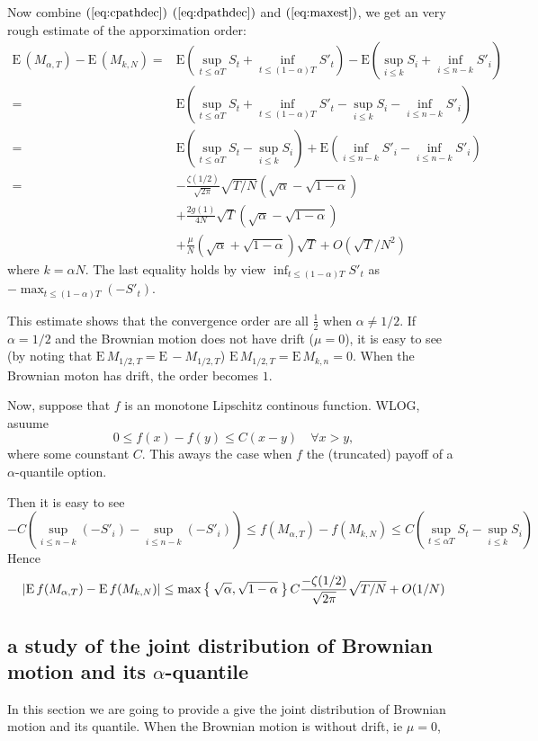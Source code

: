 \documentclass[11pt]{book}
\def\abs#1{{\left|#1\right|}}
\def\E{{\mathrm{E}\,}}
\def\EE#1{{{\mathrm{E}}\left(#1\right)}}
\begin{document}
Now combine $(\ref{eq:cpathdec})$ $(\ref{eq:dpathdec})$ and $(\ref{eq:maxest})$,
we get an very rough estimate of the apporximation order:
\begin{equation}
\begin{split}
\E (M_{\alpha,T}) - \E (M_{k,N})
=& \EE{\sup_{t\leq \alpha{T}} S_t +\inf_{t \leq (1-\alpha)T}S'_t} 
- \EE{\sup_{i\leq k} S_i+\inf_{i\leq n-k} S'_i}\\
=& \EE{\sup_{t\leq \alpha{T}} S_t +\inf_{t \leq (1-\alpha)T}S'_t
-  \sup_{i\leq k} S_i-\inf_{i\leq n-k} S'_i} \\
= &  \EE{\sup_{t\leq \alpha{T}} S_t - \sup_{i\leq k} S_i} +
\EE{\inf_{i\leq n-k} S'_i-\inf_{i\leq n-k} S'_i}\\
=& -\frac{\zeta(1/2)}{\sqrt{2\pi}}\sqrt{T/N} 
\left(\sqrt{\alpha} - \sqrt{1-\alpha}\right) \\
& + \frac{2g(1)}{4N}\sqrt{T}\left(\sqrt{\alpha} - \sqrt{1-\alpha}\right) \\
& + \frac{\mu}{N}\left(\sqrt{\alpha}+\sqrt{1-\alpha}\right)\sqrt{T}
 + O(\sqrt{T}/N^2) 
\end{split}
\end{equation}
where $k = \alpha N$.
The last equality holds by view $\inf_{t\leq (1-\alpha)T} S'_t$ as 
$-\max_{t\leq (1-\alpha)T} (-S'_t)$.

This estimate shows that the convergence order 
are all $\frac{1}{2}$ when $\alpha \neq 1/2$. If $\alpha=1/2$ and the 
Brownian motion does not have  drift ($\mu=0$), it is easy to see 
(by noting that 
$\E M_{1/2,T} = \E -M_{1/2,T}$) $\E M_{1/2,T} = \E M_{k,n} = 0$. 
When the Brownian moton has drift, the order becomes $1$. 

Now, suppose that $f$ is an monotone Lipschitz continous function.
WLOG, asuume 
\begin{equation}\label{eq:lips}
0 \leq f(x)-f(y) \leq C (x-y) \quad \forall x>y,
\end{equation}
where some counstant $C$. This aways the case when $f$ the 
(truncated) payoff of a $\alpha$-quantile option.

Then it is easy to see
\[
-C\left( \sup_{i\leq n-k} (-S'_i)-\sup_{i\leq n-k} (-S'_i)\right)
 \leq f(M_{\alpha,T}) - f(M_{k,N}) 
\leq  C \left(\sup_{t\leq \alpha{T}} S_t - \sup_{i\leq k} S_i\right)
\]
Hence 
\[
\abs{\E f(M_{\alpha,T}) - \E f(M_{k,N})} 
\leq \max\Set{\sqrt{\alpha}, \sqrt{1-\alpha}}
C\frac{-\zeta(1/2)}{\sqrt{2\pi}}\sqrt{T/N}  + O(1/N)
\]


\subsection{a study of the joint distribution of Brownian motion and its $\alpha$-quantile}
In this section we are going to provide a give the joint distribution of Brownian motion and its quantile. When the Brownian motion is without drift, ie $\mu = 0 $, 







{}

\end{document}
